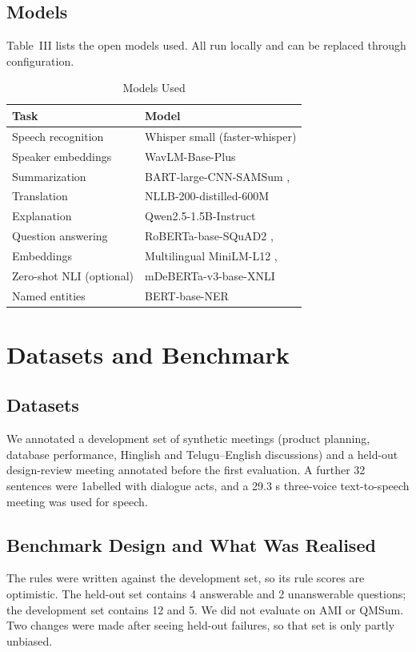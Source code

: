 \documentclass[conference]{IEEEtran}
\begin{document}
\subsection{Models}
Table~III lists the open models used. All run locally and can be replaced through configuration.

\begin{table}[htbp]
\caption{Models Used}
\centering
\footnotesize
\begin{tabular}{|L{3.1cm}|L{4.5cm}|}
\hline
\textbf{Task} & \textbf{Model} \\
\hline
Speech recognition & Whisper small (faster-whisper) \cite{b24} \\
\hline
Speaker embeddings & WavLM-Base-Plus \cite{b23} \\
\hline
Summarization & BART-large-CNN-SAMSum \cite{b12}, \cite{b13} \\
\hline
Translation & NLLB-200-distilled-600M \cite{b25} \\
\hline
Explanation & Qwen2.5-1.5B-Instruct \cite{b26} \\
\hline
Question answering & RoBERTa-base-SQuAD2 \cite{b11}, \cite{b18} \\
\hline
Embeddings & Multilingual MiniLM-L12 \cite{b19}, \cite{b20} \\
\hline
Zero-shot NLI (optional) & mDeBERTa-v3-base-XNLI \cite{b21} \\
\hline
Named entities & BERT-base-NER \cite{b10} \\
\hline
\end{tabular}
\end{table}

\section{Datasets and Benchmark}
\subsection{Datasets}
We annotated a development set of synthetic meetings (product planning, database performance, Hinglish and Telugu--English discussions) and a held-out design-review meeting annotated before the first evaluation. A further 32 sentences were 1abelled with dialogue acts, and a 29.3 s three-voice text-to-speech meeting was used for speech.

\subsection{Benchmark Design and What Was Realised}
The rules were written against the development set, so its rule scores are optimistic. The held-out set contains 4 answerable and 2 unanswerable questions; the development set contains 12 and 5. We did not evaluate on AMI or QMSum. Two changes were made after seeing held-out failures, so that set is only partly unbiased.
\end{document}

